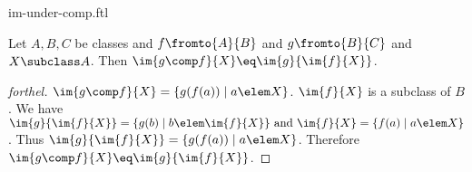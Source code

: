 \documentclass{naproche-library}
\begin{document}
\begin{smodule}[title=Image under Compositions]{im-under-comp.ftl}


\begin{proposition}[forthel,id=ImOfCompProp]
  Let $A, B, C$ be classes and $f \fromto{A}{B}$ and $g \fromto{B}{C}$ and $X \subclass A$.
  Then $\im{g \comp f}{X} \eq \im{g}{\im{f}{X}}$.
\end{proposition}
\begin{proof}[forthel]
  $\im{g \comp f}{X} = \{ g(f(a)) \mid a \elem X \}$.
  $\im{f}{X}$ is a subclass of $B$.
  We have $\im{g}{\im{f}{X}} = \{ g(b) \mid b \elem \im{f}{X} \}\text{ and }\im{f}{X} = \{ f(a) \mid a \elem X \}$.
  Thus $\im{g}{\im{f}{X}} = \{ g(f(a)) \mid a \elem X \}$.
  Therefore $\im{g \comp f}{X} \eq \im{g}{\im{f}{X}}$.
\end{proof}

\end{smodule}
\end{document}
